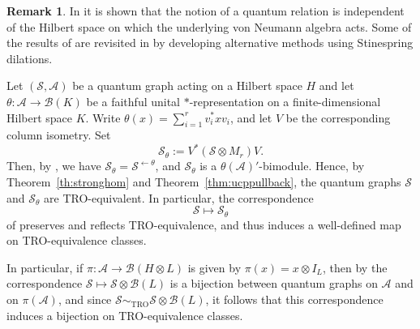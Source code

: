 \documentclass[11pt]{amsart}
\numberwithin{equation}{section}
\theoremstyle{plain}
\theoremstyle{definition}
\newtheorem{remark}[theorem]{Remark}
\theoremstyle{remark}
\newcommand{\A}{{\mathcal{A}}}
\newcommand{\B}{{\mathcal{B}}}
\renewcommand{\S}{{\mathcal{S}}}
\begin{document}
\begin{remark}
In \cite[Theorem 2.7]{Wea12} it is shown that the notion of a quantum relation is independent of the Hilbert space on which the underlying von Neumann algebra acts. Some of the results of \cite{Wea12} are revisited in \cite{Daws24} by developing alternative methods using Stinespring dilations.

Let $(\S,\A)$ be a quantum graph acting on a Hilbert space $H$ and let $\theta \colon \A \to \B(K)$ be a faithful unital $*$-representation on a finite-dimensional Hilbert space $K$. Write $\theta(x)=\sum_{i=1}^r v_i^*xv_i$, and let $V$ be the corresponding column isometry. Set
\[
\S_\theta:=V^*(\S\otimes M_r)V.
\]
Then, by \cite[Theorem 7.5]{Daws24}, we have $\S_\theta=\S^{\leftarrow\theta}$,
and $\S_\theta$ is a $\theta(\A)'$-bimodule. Hence, by Theorem~\ref{th:stronghom} and Theorem~\ref{thm:ucppullback}, the quantum graphs $\S$ and $\S_\theta$ are TRO-equivalent. In particular, the correspondence 
\[
\S\mapsto \S_\theta
\]
of \cite[Lemma 7.4]{Daws24} preserves and reflects TRO-equivalence, and thus induces a well-defined map on TRO-equivalence classes.

In particular, if $\pi\colon \A \to \B(H\otimes L)$ is given by $\pi(x)=x\otimes I_L$, then by \cite[Lemma 7.3]{Daws24} the correspondence $\S \mapsto\S \otimes \B(L)$ is a bijection between quantum graphs on $\A$ and on $\pi(\A)$, and since $\S \sim_{\mathrm{TRO}} \S\otimes \B(L)$, it follows that this correspondence  induces a bijection on TRO-equivalence classes.
\end{remark}
\end{document}

